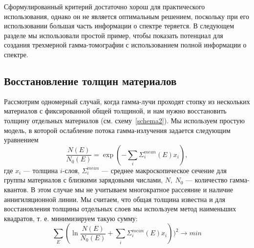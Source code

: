 Сформулированный критерий достаточно хорош для практического использования, однако он не является оптимальным решением, поскольку при его использовании большая часть информации о спектре теряется. В следующем разделе мы использовали простой пример, чтобы показать потенциал для создания трехмерной гамма-томографии с использованием полной информации о спектре.

\subsection{Восстановление толщин материалов}
Рассмотрим одномерный случай, когда гамма-лучи проходят стопку из нескольких материалов с фиксированной общей толщиной, и нам нужно восстановить толщину отдельных материалов (см. схему~\ref{schema2}). Мы используем простую модель, в которой ослабление потока гамма-излучения задается следующим уравнением
\begin{equation}
\label{eq:gamma}
\frac{N(E)}{N_0(E)} = \exp(-\sum_i \Sigma^{mean}_i(E)x_i),
\end{equation}
где $x_i$ --- толщина $i$-слоя, $\Sigma^{mean}_i$ --- среднее макроскопическое сечение для группы материалов с близкими зарядовыми числами, $N,~N_0$ --- количество гамма-квантов. В этом случае мы не учитываем многократное рассеяние и наличие аннигиляционной линии. Мы считаем, что общая толщина известна и для восстановления толщины отдельных слоев мы используем метод наименьших квадратов, т. е. минимизируем такую сумму:
\begin{equation}
\sum_E(\ln \frac{N(E)}{N_0(E)} + \sum_i \Sigma^{mean}_i(E)x_i))^2 \to min
\end{equation}

